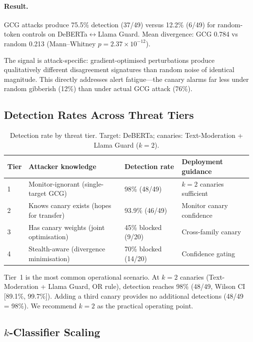 \documentclass{article}
\begin{document}
\paragraph{Result.} GCG attacks produce 75.5\% detection (37/49) versus 12.2\% (6/49) for random-token controls on DeBERTa$\leftrightarrow$Llama Guard. Mean divergence: GCG 0.784 vs random 0.213 (Mann--Whitney $p = 2.37 \times 10^{-12}$).

The signal is attack-specific: gradient-optimised perturbations produce qualitatively different disagreement signatures than random noise of identical magnitude. This directly addresses alert fatigue---the canary alarms far less under random gibberish (12\%) than under actual GCG attack (76\%).

\subsection{Detection Rates Across Threat Tiers}

\begin{table}[t]
\caption{Detection rate by threat tier. Target: DeBERTa; canaries: Text-Moderation + Llama Guard ($k{=}2$).}
\label{tab:threat-tiers}
\centering
\small
\begin{tabular}{llll}
\toprule
\textbf{Tier} & \textbf{Attacker knowledge} & \textbf{Detection rate} & \textbf{Deployment guidance} \\
\midrule
1 & Monitor-ignorant (single-target GCG) & 98\% (48/49) & $k{=}2$ canaries sufficient \\
2 & Knows canary exists (hopes for transfer) & 93.9\% (46/49) & Monitor canary confidence \\
3 & Has canary weights (joint optimisation) & 45\% blocked (9/20) & Cross-family canary \\
4 & Stealth-aware (divergence minimisation) & 70\% blocked (14/20) & Confidence gating \\
\bottomrule
\end{tabular}
\end{table}

Tier~1 is the most common operational scenario. At $k{=}2$ canaries (Text-Moderation + Llama Guard, OR rule), detection reaches 98\% (48/49, Wilson CI [89.1\%, 99.7\%]). Adding a third canary provides no additional detections (48/49 = 98\%). We recommend $k{=}2$ as the practical operating point.

\subsection{$k$-Classifier Scaling}
\label{sec:k-scaling}
\end{document}
